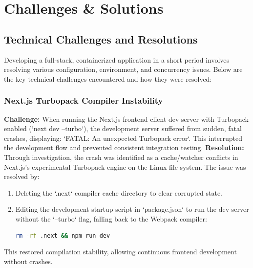 \chapter{Challenges \& Solutions}

\section{Technical Challenges and Resolutions}
Developing a full-stack, containerized application in a short period involves resolving various configuration, environment, and concurrency issues. Below are the key technical challenges encountered and how they were resolved:

\subsection{Next.js Turbopack Compiler Instability}
\textbf{Challenge:} When running the Next.js frontend client dev server with Turbopack enabled (`next dev --turbo`), the development server suffered from sudden, fatal crashes, displaying: `FATAL: An unexpected Turbopack error`. This interrupted the development flow and prevented consistent integration testing.
\textbf{Resolution:} Through investigation, the crash was identified as a cache/watcher conflicts in Next.js's experimental Turbopack engine on the Linux file system. The issue was resolved by:
\begin{enumerate}
    \item Deleting the `.next` compiler cache directory to clear corrupted state.
    \item Editing the development startup script in `package.json` to run the dev server without the `--turbo` flag, falling back to the Webpack compiler:
    \begin{lstlisting}[language=bash]
    rm -rf .next && npm run dev
    \end{lstlisting}
\end{enumerate}
This restored compilation stability, allowing continuous frontend development without crashes.

